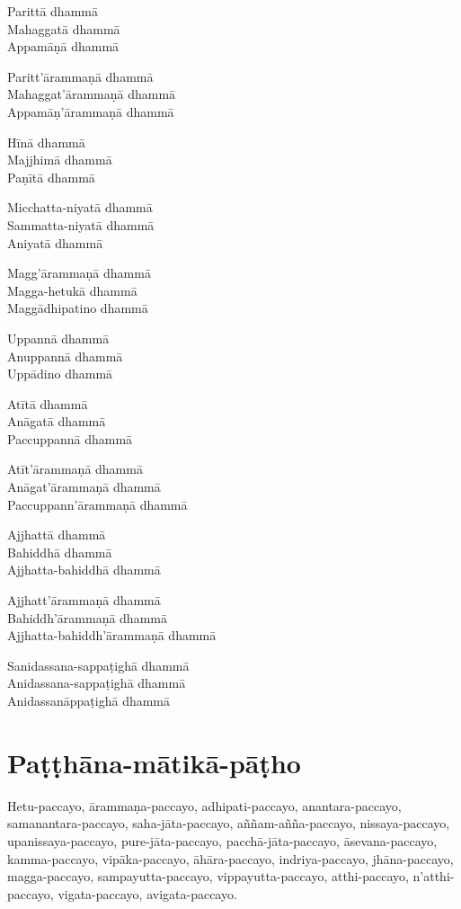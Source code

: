 \begin{paritta}
Parittā dhammā\\
Mahaggatā dhammā\\
Appamāṇā dhammā

Paritt'ārammaṇā dhammā\\
Mahaggat'ārammaṇā dhammā\\
Appamāṇ'ārammaṇā dhammā

Hīnā dhammā\\
Majjhimā dhammā\\
Paṇītā dhammā

Micchatta-niyatā dhammā\\
Sammatta-niyatā dhammā\\
Aniyatā dhammā

Magg'ārammaṇā dhammā\\
Magga-hetukā dhammā\\
Maggādhipatino dhammā

Uppannā dhammā\\
Anuppannā dhammā\\
Uppādino dhammā

Atītā dhammā\\
Anāgatā dhammā\\
Paccuppannā dhammā

Atīt'ārammaṇā dhammā\\
Anāgat'ārammaṇā dhammā\\
Paccuppann'ārammaṇā dhammā

Ajjhattā dhammā\\
Bahiddhā dhammā\\
Ajjhatta-bahiddhā dhammā

Ajjhatt'ārammaṇā dhammā\\
Bahiddh'ārammaṇā dhammā\\
Ajjhatta-bahiddh'ārammaṇā dhammā

Sanidassana-sappaṭighā dhammā\\
Anidassana-sappaṭighā dhammā\\
Anidassanāppaṭighā dhammā
\end{paritta}

\chapter{Paṭṭhāna-mātikā-pāṭho}%

Hetu-paccayo, ārammaṇa-paccayo, adhipati-paccayo, anantara-paccayo,
samanantara-paccayo, saha-jāta-paccayo, aññam-añña-paccayo,
nissaya-paccayo, upanissaya-paccayo, pure-jāta-paccayo,
pacchā-jāta-paccayo, āsevana-paccayo, kamma-paccayo, vipāka-paccayo,
āhāra-paccayo, indriya-paccayo, jhāna-paccayo, magga-paccayo,
sampayutta-paccayo, vippayutta-paccayo, atthi-paccayo, n'atthi-paccayo,
vigata-paccayo, avigata-paccayo.

